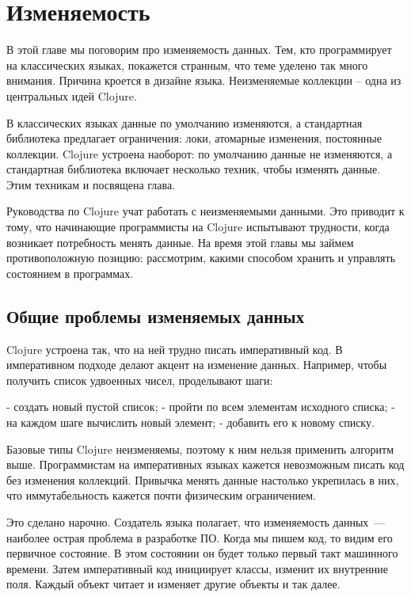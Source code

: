 \chapter{Изменяемость}

\begin{teaser}
В этой главе мы поговорим про изменяемость данных. Тем, кто программирует на
классических языках, покажется странным, что теме уделено так много
внимания. Причина кроется в дизайне языка. Неизменяемые коллекции -- одна из
центральных идей Clojure.
\end{teaser}

В классических языках данные по умолчанию изменяются, а стандартная библиотека
предлагает ограничения: локи, атомарные изменения, постоянные коллекции. Clojure
устроена наоборот: по умолчанию данные не изменяются, а стандартная библиотека
включает несколько техник, чтобы изменять данные. Этим техникам и посвящена
глава.

Руководства по Clojure учат работать с неизменяемыми данными. Это приводит к
тому, что начинающие программисты на Clojure испытывают трудности, когда
возникает потребность менять данные. На время этой главы мы займем
противоположную позицию: рассмотрим, какими способом хранить и управлять
состоянием в программах.

\section{Общие проблемы изменяемых данных}

Clojure устроена так, что на ней трудно писать императивный код. В императивном
подходе делают акцент на изменение данных. Например, чтобы получить список
удвоенных чисел, проделывают шаги:

- создать новый пустой список;
- пройти по всем элементам исходного списка;
- на каждом шаге вычислить новый элемент;
- добавить его к новому списку.

Базовые типы Clojure неизменяемы, поэтому к ним нельзя применить алгоритм
выше. Программистам на императивных языках кажется невозможным писать код без
изменения коллекций. Привычка менять данные настолько укрепилась в них, что
иммутабельность кажется почти физическим ограничением.

Это сделано нарочно. Создатель языка полагает, что изменяемость данных~---
наиболее острая проблема в разработке ПО. Когда мы пишем код, то видим его
первичное состояние. В этом состоянии он будет только первый такт машинного
времени. Затем императивный код инициирует классы, изменит их внутренние
поля. Каждый объект читает и изменяет другие объекты и так далее.

